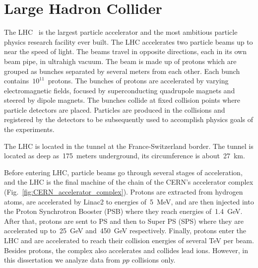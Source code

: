 \section{Large Hadron Collider}
\label{sec:Exp_LHC}

The LHC~\cite{ref_LHC_brochure,ref_LHC_TDR,ref_LHC_website} is the largest particle accelerator and the most ambitious particle physics research facility ever built. The LHC accelerates two particle beams up to near the speed of light. The beams travel in opposite directions, each in its own beam pipe, in ultrahigh vacuum. The beam is made up of protons which are grouped as bunches separated by several meters from each other. Each bunch contains~$10^{11}$~protons. The bunches of protons are accelerated by varying electromagnetic fields, focused by superconducting quadrupole magnets and steered by dipole magnets. The bunches collide at fixed collision points where particle detectors are placed. Particles are produced in the collisions and registered by the detectors to be subsequently used to accomplish physics goals of the experiments.  


The LHC is located in the tunnel at the France-Switzerland border. The tunnel is located as deep as~175~meters underground, its circumference is about~27~km.

Before entering LHC, particle beams go through several stages of acceleration, and the LHC is the final machine of the chain of the CERN's accelerator complex (Fig.~\ref{fig:CERN_accelerator_complex}). Protons are extracted from hydrogen atoms, are accelerated by Linac2 to energies of~5~MeV, and are then injected into the Proton Synchrotron Booster (PSB) where they reach energies of~1.4~GeV. After that, protons are sent to PS and then to Super PS (SPS) where they are accelerated up to~25~GeV and~450~GeV respectively. Finally, protons enter the LHC and are accelerated to reach their collision energies of several TeV per beam. Besides protons, the complex also accelerates and collides lead ions. However, in this dissertation we analyze data from $pp$ collisions only.   


